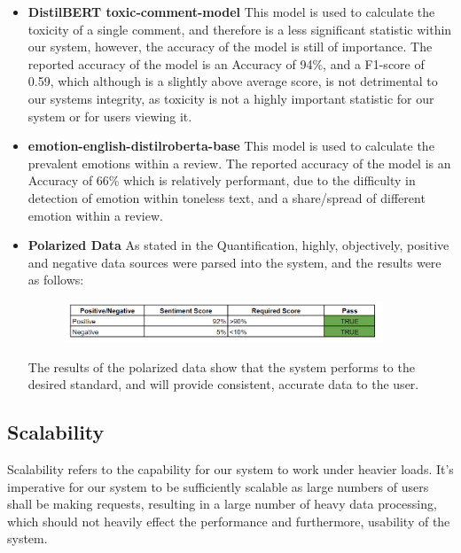 \documentclass[12pt]{article}
\begin{document}
\begin{itemize}
    \item \textbf{DistilBERT toxic-comment-model} This model is used to calculate the toxicity of a single comment, and therefore is a less significant statistic within our system, however, the accuracy of the model is still of importance. The reported accuracy of the model is an Accuracy of 94\%, and a F1-score of 0.59, which although is a slightly above average score, is not detrimental to our systems integrity, as toxicity is not a highly important statistic for our system or for users viewing it.
    \item \textbf{emotion-english-distilroberta-base} This model is used to calculate the prevalent emotions within a review. The reported accuracy of the model is an Accuracy of 66\% which is relatively performant, due to the difficulty in detection of emotion within toneless text, and a share/spread of different emotion within a review.
    \item \textbf{Polarized Data} As stated in the Quantification, highly, objectively, positive and negative data sources were parsed into the system, and the results were as follows:
          \begin{figure}[H]
              \centering
              \includegraphics[width=0.9\textwidth]{PositiveAndNegative.png}
          \end{figure}
          The results of the polarized data show that the system performs to the desired standard, and will provide consistent, accurate data to the user.
\end{itemize}
\newpage
\subsection{Scalability}
Scalability refers to the capability for our system to work under heavier loads. It's imperative for our system to be sufficiently scalable as large numbers of users shall be making requests, resulting in a large number of heavy data processing, which should not heavily effect the performance and furthermore, usability of the system.
\end{document}
